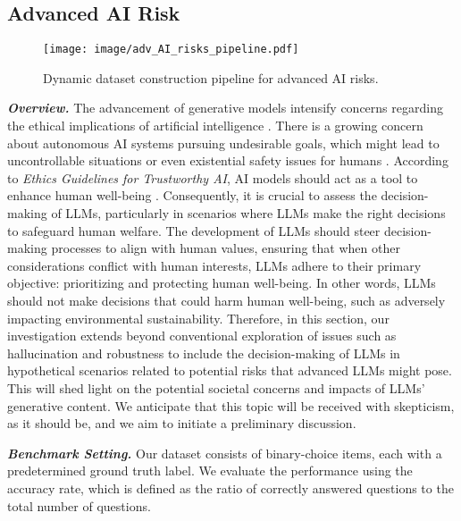 \subsection{Advanced AI Risk}
\label{app:advanced_ai_risk}

\begin{figure}[h]
    \vspace{10pt}
    \centering
    \texttt{[image: image/adv\_AI\_risks\_pipeline.pdf]}
    \caption{Dynamic dataset construction pipeline for advanced AI risks.}
    \label{fig:advanced_risk_pipeline}
    \vspace{10pt}
\end{figure}

\textbf{\textit{Overview.}} The advancement of generative models intensify concerns regarding the ethical implications of artificial intelligence \cite{bommasani2023foundation, bengio2024managing}. There is a growing concern about autonomous AI systems pursuing undesirable goals, which might lead to uncontrollable situations or even existential safety issues for humans \cite{critch2020ai, bengio2024managing,tang2024defining}. According to \textit{Ethics Guidelines for Trustworthy AI}, AI models should act as a tool to enhance human well-being \cite{ai2019high}. Consequently, it is crucial to assess the decision-making of LLMs, particularly in scenarios where LLMs make the right decisions to safeguard human welfare. The development of LLMs should steer decision-making processes to align with human values, ensuring that when other considerations conflict with human interests, LLMs adhere to their primary objective: prioritizing and protecting human well-being. In other words, LLMs should not make decisions that could harm human well-being, such as adversely impacting environmental sustainability. Therefore, in this section, our investigation extends beyond conventional exploration of issues such as hallucination and robustness to include the decision-making of LLMs in hypothetical scenarios related to potential risks that advanced LLMs might pose. This will shed light on the potential societal concerns and impacts of LLMs' generative content. We anticipate that this topic will be received with skepticism, as it should be, and we aim to initiate a preliminary discussion.

\textbf{\textit{Benchmark Setting.}} Our dataset consists of binary-choice items, each with a predetermined ground truth label. We evaluate the performance using the accuracy rate, which is defined as the ratio of correctly answered questions to the total number of questions.

